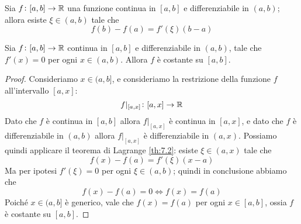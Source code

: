 \begin{theorem}[di Lagrange]
    \label{th:7.2}
    Sia $f\colon[a,b]\to\amsbb{R}$ una funzione continua in $[a,b]$ e differenziabile in $(a,b)$; allora esiste $\xi\in(a,b)$ tale che
    \[
    f(b)-f(a) = f'(\xi)(b-a)
    \]
\end{theorem}
\begin{corollary}
    \label{cor:7.1}
    Sia $f\colon [a,b]\to \amsbb{R}$ continua in $[a,b]$ e differenziabile in $(a,b)$, tale che $f'(x) = 0$ per ogni $x\in(a,b)$. Allora $f$ è costante su $[a,b]$.
\end{corollary}
\begin{proof}
    Consideriamo $x\in(a,b]$, e consideriamo la restrizione della funzione $f$ all'intervallo $[a,x]$:
    \[
    f|_{[a,x]} \colon [a,x]\to \amsbb{R}
    \]
    Dato che $f$ è continua in $[a,b]$ allora $f|_{[a,x]}$ è continua in $[a,x]$, e dato che $f$ è differenziabile in $(a,b)$ allora $f|_{[a,x]}$ è differenziabile in $(a,x)$. Possiamo quindi applicare il teorema di Lagrange \ref{th:7.2}: esiste $\xi\in(a,x)$ tale che
    \[
    f(x)-f(a) = f'(\xi)(x-a)
    \]
    Ma per ipotesi $f'(\xi) = 0$ per ogni $\xi\in(a,b)$; quindi in conclusione abbiamo che
    \[
    f(x)-f(a) = 0 \iff f(x)=f(a)
    \]
    Poiché $x\in(a,b]$ è generico, vale che $f(x)=f(a)$ per ogni $x\in[a,b]$, ossia $f$ è costante su $[a,b]$.
\end{proof}
